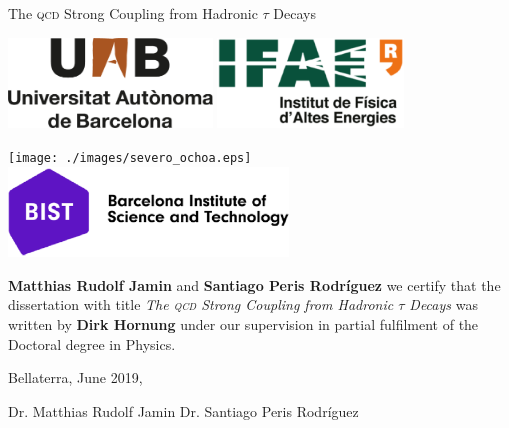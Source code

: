\documentclass[12pt,a4paper,openright]{scrreprt}
\makeatletter
\numberwithin{equation}{section}       %
\let\org@subfile
\renewcommand*{}[1]{%
  \filename@parse{#1}%
  \expandafter
  \graphicspath\expandafter{\expandafter{\filename@area}}%
  \org@subfile{#1}%
}
\makeatother
\begin{document}
\begin{center}
  \Large
  The \textsc{qcd} Strong Coupling from Hadronic \(\tau\) Decays

  \makebox[\linewidth]{\rule{\textwidth}{1pt}}

  \vspace{2cm}

  \includegraphics[height=2.4cm]{./images/logo_UAB.eps} \hfill
  \includegraphics[height=2.4cm]{./images/logo_IFAE.eps}

  \vspace{1cm}

  \texttt{[image: ./images/severo\_ochoa.eps]} \hfill
  \includegraphics[height=2.4cm]{./images/bist.eps}

  \vspace{3cm}
\end{center}

\large
\textbf{Matthias Rudolf Jamin} and \textbf{Santiago Peris Rodríguez} we
certify that the dissertation with title \textit{The \textsc{qcd} Strong Coupling from
Hadronic \(\tau\) Decays} was written by \textbf{Dirk Hornung} under our
supervision in partial fulfilment of the Doctoral degree in Physics.

\vfill
Bellaterra, June 2019, \par
\vspace{0.2cm}
Dr. Matthias Rudolf Jamin \hfill Dr. Santiago Peris Rodríguez
\vspace{1cm}
\normalsize


  



\setcounter{tocdepth}{1}
\tableofcontents

\newpage
{}





\appendix

\printnomenclature
\printbibliography[heading=bibintoc]
\end{document}
